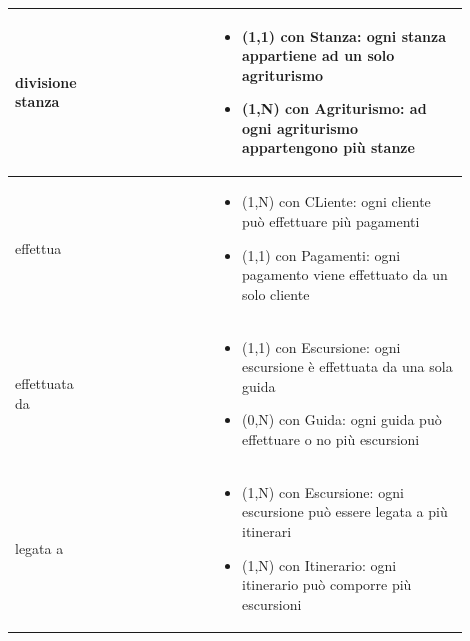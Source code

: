 \documentclass[12pt,a4paper]{article}
\begin{document}
\begin{center}
\begin{longtable}{|p{0.16\linewidth}|p{0.24\linewidth}|p{0.50\linewidth}|}
\hline
divisione stanza 				& \begin{flushleft}\vspace{-15pt}  \end{flushleft}
					& \begin{itemize}
						\setlength{\itemindent}{-1em}
						\vspace{-25pt}
						\setlength\itemsep{-0.25em}
						\item (1,1) con Stanza: ogni stanza appartiene ad un solo agriturismo
						\item (1,N) con Agriturismo: ad ogni agriturismo appartengono più stanze
					\end{itemize}\\ 

\hline
effettua 				& \begin{flushleft}\vspace{-15pt}  \end{flushleft}
					& \begin{itemize}
						\setlength{\itemindent}{-1em}
						\vspace{-25pt}
						\setlength\itemsep{-0.25em}
						\item (1,N) con CLiente: ogni cliente può effettuare più pagamenti
						\item (1,1) con Pagamenti: ogni pagamento viene effettuato da un solo cliente
					\end{itemize}\\ 

\hline
effettuata da 				& \begin{flushleft}\vspace{-15pt}  \end{flushleft}
					& \begin{itemize}
						\setlength{\itemindent}{-1em}
						\vspace{-25pt}
						\setlength\itemsep{-0.25em}
						\item (1,1) con Escursione: ogni escursione è effettuata da una sola guida
						\item (0,N) con Guida: ogni guida può effettuare o no più escursioni
					\end{itemize}\\ 

\hline
legata a 				& \begin{flushleft}\vspace{-15pt}  \end{flushleft}
					& \begin{itemize}
						\setlength{\itemindent}{-1em}
						\vspace{-25pt}
						\setlength\itemsep{-0.25em}
						\item (1,N) con Escursione: ogni escursione può essere legata a più itinerari
						\item (1,N) con Itinerario: ogni itinerario può comporre più escursioni
					\end{itemize}\\ 


\end{longtable}
\end{center}
\end{document}
